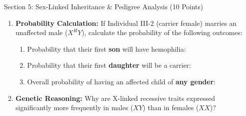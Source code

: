 \documentclass[10pt,a4paper]{scrartcl}
\begin{document}
\begin{sectionbox}{Section 5: Sex-Linked Inheritance \& Pedigree Analysis (10 Points)}
\begin{enumerate}
  \item \textbf{Probability Calculation:} If Individual III-2 (carrier female) marries an unaffected male ($X^H Y$), calculate the probability of the following outcomes:
  \begin{enumerate}
    \item Probability that their first \textbf{son} will have hemophilia: \underline{\hspace{2.0cm}}
    \item Probability that their first \textbf{daughter} will be a carrier: \underline{\hspace{2.0cm}}
    \item Overall probability of having an affected child of \textbf{any gender}: \underline{\hspace{2.0cm}}
  \end{enumerate}

  \item \textbf{Genetic Reasoning:} Why are X-linked recessive traits expressed significantly more frequently in males ($XY$) than in females ($XX$)?
\end{enumerate}

\vspace{1pt}
\begin{workspace}
  \vspace{0.8cm}
\end{workspace}
\end{sectionbox}

\vspace{3pt}
\end{document}
